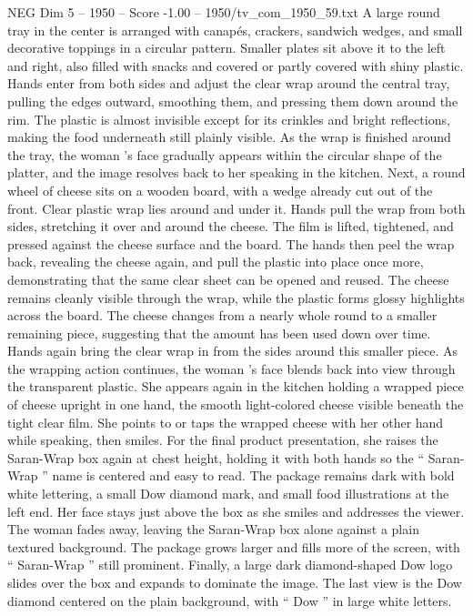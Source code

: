 \begin{textsample}{NEG Dim 5 – 1950 – Score -1.00 – 1950/tv\_com\_1950\_59.txt}
A large round tray in the center is arranged with canapés, crackers, sandwich wedges, and small decorative toppings in a circular pattern.
Smaller plates sit above it to the left and right, also filled with snacks and covered or partly covered with shiny plastic.
Hands enter from both sides and adjust the clear wrap around the central tray, pulling the edges outward, smoothing them, and pressing them down around the rim.
The plastic is almost invisible except for its crinkles and bright reflections, making the food underneath still plainly visible.
As the wrap is finished around the tray, the woman ’s face gradually appears within the circular shape of the platter, and the image resolves back to her speaking in the kitchen.
Next, a round wheel of cheese sits on a wooden board, with a wedge already cut out of the front.
Clear plastic wrap lies around and under it.
Hands pull the wrap from both sides, stretching it over and around the cheese.
The film is lifted, tightened, and pressed against the cheese surface and the board.
The hands then peel the wrap back, revealing the cheese again, and pull the plastic into place once more, demonstrating that the same clear sheet can be opened and reused.
The cheese remains cleanly visible through the wrap, while the plastic forms glossy highlights across the board.
The cheese changes from a nearly whole round to a smaller remaining piece, suggesting that the amount has been used down over time.
Hands again bring the clear wrap in from the sides around this smaller piece.
As the wrapping action continues, the woman ’s face blends back into view through the transparent plastic.
She appears again in the kitchen holding a wrapped piece of cheese upright in one hand, the smooth light-colored cheese visible beneath the tight clear film.
She points to or taps the wrapped cheese with her other hand while speaking, then smiles.
For the final product presentation, she raises the Saran-Wrap box again at chest height, holding it with both hands so the “ Saran-Wrap ” name is centered and easy to read.
The package remains dark with bold white lettering, a small Dow diamond mark, and small food illustrations at the left end.
Her face stays just above the box as she smiles and addresses the viewer.
The woman fades away, leaving the Saran-Wrap box alone against a plain textured background.
The package grows larger and fills more of the screen, with “ Saran-Wrap ” still prominent.
Finally, a large dark diamond-shaped Dow logo slides over the box and expands to dominate the image.
The last view is the Dow diamond centered on the plain background, with “ Dow ” in large white letters.

\end{textsample}
